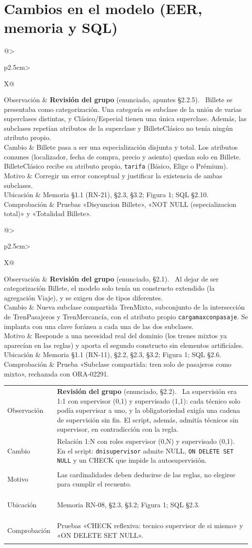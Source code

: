 \documentclass[11pt,a4paper]{article}
\makeatletter
\DeclareRobustCommand{\_}{\textunderscore\allowbreak}
\newcommand{\tb}[1]{\texttt{#1}}
\newcommand{\REV}[1]{\textbf{Revisión del grupo} (enunciado, #1).~}
\newcommand{\cambio}[7]{%
\begin{tcolorbox}[colback=white,colframe=azuluvigo,colbacktitle=azuluvigo!8,coltitle=azuluvigo,
  title={\textbf{#1}\quad #2},fonttitle=\normalsize,boxrule=0.6pt,arc=1mm,
  left=2mm,right=2mm,top=1mm,bottom=1mm,before skip=6pt,after skip=6pt]
\small
\begin{tabularx}{\linewidth}{@{}>{\bfseries\raggedright\arraybackslash}p{2.5cm}>{\raggedright\arraybackslash}X@{}}
Observación & #3\\
Cambio & #4\\
Motivo & #5\\
Ubicación & #6\\
Comprobación & #7\\
\end{tabularx}
\end{tcolorbox}}
\makeatother
\begin{document}
\section{Cambios en el modelo (EER, memoria y SQL)}
\cambio{E-01}{Billete: especialización disjunta y total}
{\REV{apuntes §2.2.5} Billete se presentaba como categorización. Una categoría es subclase de la unión de varias superclases distintas, y Clásico/Especial tienen una única superclase. Además, las subclases repetían atributos de la superclase y Billete\_Clásico no tenía ningún atributo propio.}
{Billete pasa a ser una especialización disjunta y total. Los atributos comunes (localizador, fecha de compra, precio y asiento) quedan solo en Billete. Billete\_Clásico recibe su atributo propio, \tb{tarifa} (Básico, Elige o Prémium).}
{Corregir un error conceptual y justificar la existencia de ambas subclases.}
{Memoria §1.1 (RN-21), §2.3, §3.2; Figura 1; SQL §2.10.}
{Pruebas «Disyuncion Billete», «NOT NULL (especializacion total)» y «Totalidad Billete».}

\cambio{E-02}{Subclase compartida Tren\_Mixto}
{\REV{§2.1} Al dejar de ser categorización Billete, el modelo solo tenía un constructo extendido (la agregación Viaje), y se exigen dos de tipos diferentes.}
{Nueva subclase compartida Tren\_Mixto, subconjunto de la intersección de Tren\_Pasajeros y Tren\_Mercancía, con el atributo propio \tb{carga\_max\_con\_pasaje}. Se implanta con una clave foránea a cada una de las dos subclases.}
{Responde a una necesidad real del dominio (los trenes mixtos ya aparecían en las reglas) y aporta el segundo constructo sin elementos artificiales.}
{Memoria §1.1 (RN-11), §2.2, §2.3, §3.2; Figura 1; SQL §2.6.}
{Prueba «Subclase compartida: tren solo de pasajeros como mixto», rechazada con ORA-02291.}

\cambio{E-03}{Supervisión de técnicos 1:N}
{\REV{§2.2} La supervisión era 1:1 con supervisor (0,1) y supervisado (1,1): cada técnico solo podía supervisar a uno, y la obligatoriedad exigía una cadena de supervisión sin fin. El script, además, admitía técnicos sin supervisor, en contradicción con la regla.}
{Relación 1:N con roles supervisor (0,N) y supervisado (0,1). En el script: \tb{dni\_supervisor} admite NULL, \tb{ON DELETE SET NULL} y un CHECK que impide la autosupervisión.}
{Las cardinalidades deben deducirse de las reglas, no elegirse para cumplir el recuento.}
{Memoria RN-08, §2.3, §3.2; Figura 1; SQL §2.3.}
{Pruebas «CHECK reflexiva: tecnico supervisor de si mismo» y «ON DELETE SET NULL».}
\end{document}

